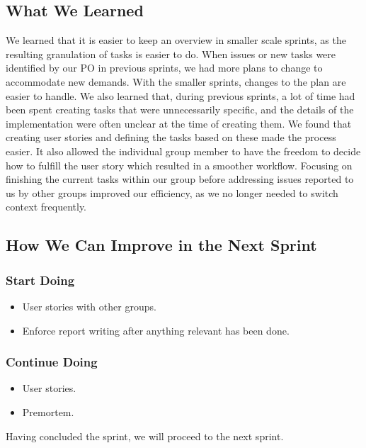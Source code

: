 \subsection{What We Learned}
We learned that it is easier to keep an overview in smaller scale sprints, as the resulting granulation of tasks is easier to do. When issues or new tasks were identified by our PO in previous sprints, we had more plans to change to accommodate new demands. With the smaller sprints, changes to the plan are easier to handle. 
We also learned that, during previous sprints, a lot of time had been spent creating tasks that were unnecessarily specific, and the details of the implementation were often unclear at the time of creating them. We found that creating user stories and defining the tasks based on these made the process easier. It also allowed the individual group member to have the freedom to decide how to fulfill the user story which resulted in a smoother workflow.  
Focusing on finishing the current tasks within our group before addressing issues reported to us by other groups improved our efficiency, as we no longer needed to switch context frequently.

\subsection{How We Can Improve in the Next Sprint}
\subsubsection{Start Doing}
\begin{itemize}
    \item User stories with other groups.
    \item Enforce report writing after anything relevant has been done.
\end{itemize}
\subsubsection{Continue Doing}
\begin{itemize}
    \item User stories.
    \item Premortem.
\end{itemize}

Having concluded the sprint, we will proceed to the next sprint.
